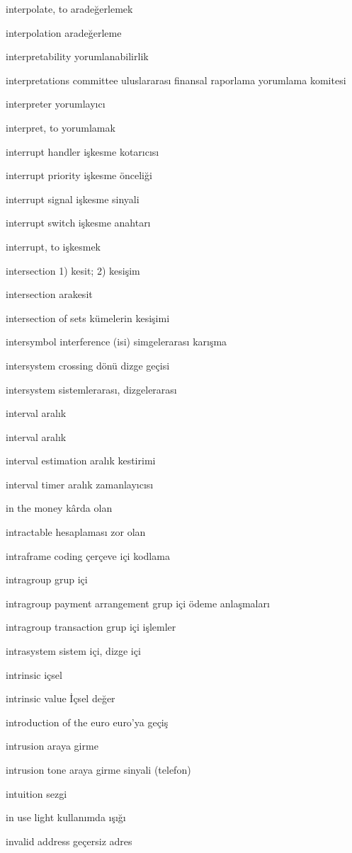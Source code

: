 \documentclass[12pt,fleqn]{article}\usepackage{../../common}
\begin{document}
interpolate, to aradeğerlemek

interpolation aradeğerleme

interpretability yorumlanabilirlik

interpretations committee uluslararası finansal raporlama yorumlama komitesi

interpreter yorumlayıcı

interpret, to yorumlamak

interrupt handler işkesme kotarıcısı

interrupt priority işkesme önceliği

interrupt signal işkesme sinyali

interrupt switch işkesme anahtarı

interrupt, to işkesmek

intersection 1) kesit; 2) kesişim

intersection arakesit

intersection of sets kümelerin kesişimi

intersymbol interference (isi) simgelerarası karışma

intersystem crossing dönü dizge geçisi

intersystem sistemlerarası, dizgelerarası

interval aralık

interval aralık

interval estimation aralık kestirimi

interval timer aralık zamanlayıcısı

in the money kârda olan

intractable hesaplaması zor olan

intraframe coding çerçeve içi kodlama

intragroup grup içi

intragroup payment arrangement grup içi ödeme anlaşmaları

intragroup transaction grup içi işlemler

intrasystem sistem içi, dizge içi

intrinsic içsel 

intrinsic value İçsel değer

introduction of the euro euro'ya geçiş

intrusion araya girme

intrusion tone araya girme sinyali (telefon)

intuition sezgi

in use light kullanımda ışığı

invalid address geçersiz adres
\end{document}
